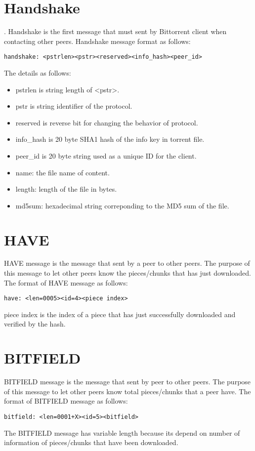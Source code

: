 \begin{appendices}
\section{Handshake}.  
Handshake is the first message that must sent by Bittorrent client when contacting other peers. 
Handshake message format as follows: 
\begin{verbatim}
handshake: <pstrlen><pstr><reserved><info_hash><peer_id>
\end{verbatim}
The details as follows:
\begin{itemize}
	\item pstrlen is string length of <pstr>.
	\item pstr is string identifier of the protocol.
	\item reserved is reverse bit for changing the behavior of protocol.
	\item info\_hash is 20 byte SHA1 hash of the info key in torrent file. 
	\item peer\_id is 20 byte string used as a unique ID for the client.
	\item name:  the file name of content.
	\item length: length of the file in bytes.
	\item md5sum: hexadecimal string correponding to the MD5 sum of the file. 
\end{itemize}

\section{HAVE}
HAVE message is the message that sent by a peer to other peers.  
The purpose of this message to let other peers know the pieces/chunks that has just downloaded.
The format of HAVE message as follows:
\begin{verbatim}
have: <len=0005><id=4><piece index>
\end{verbatim}
piece index is the index of a piece that has just successfully downloaded and verified by the hash.

\section{BITFIELD}

BITFIELD message is the message that sent by peer to other peers.
The purpose of this message to let other peers know total pieces/chunks that a peer have.
The format of BITFIELD message as follows:
\begin{verbatim}
bitfield: <len=0001+X><id=5><bitfield>
\end{verbatim}
The BITFIELD message has variable length because its depend on number of information of pieces/chunks that have been downloaded. 



\end{appendices}
